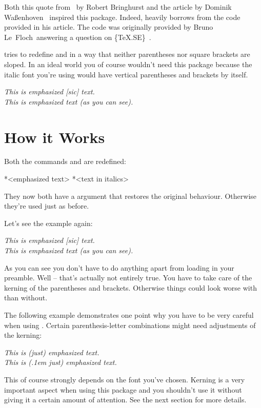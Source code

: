 \documentclass[DIV10,toc=index,toc=bib]{cnpkgdoc}
\begin{document}
\noindent
Both this quote from~ by Robert Bringhurst and the
article  by Dominik Waßenhoven~\cite{dtk12-dw} inspired
this package. Indeed, \embrac heavily borrows from the code \citeauthor{dtk12-dw}
provided in his article\manythanks. The code was originally provided by Bruno
Le~Floch\manythanks\ answering a question on \{TeX.SE\}~\cite{lefloch11}.

\embrac tries to redefine  and  in a way that neither
parentheses nor square brackets are sloped. In an ideal world you of course
wouldn't need this package because the italic font you're using would have
vertical parentheses and brackets by itself.

\begin{beispiel}
 \emph{This is emphasized [sic] text.} \\
 \emph{This is emphasized text (as you can see).}
\end{beispiel}

\section{How it Works}
Both the commands  and  are redefined:
\begin{beschreibung}
 *{<emphasized text>}
 *{<text in italics>}
\end{beschreibung}
They now both have a \code{*} argument that restores the original behaviour.
Otherwise they're used just as before.

Let's see the example again:
\begin{beispiel}
 \emph{This is emphasized [sic] text.} \\
 \emph{This is emphasized text (as you can see).}
\end{beispiel}
As you can see you don't have to do anything apart from loading \embrac in your
preamble. Well -- that's actually not entirely true. You have to take care of the
kerning of the parentheses and brackets. Otherwise things could look worse with
\embrac than without.

The following example demonstrates one point why you have to be very careful
when using \embrac. Certain parenthesis-letter combinations might need adjustments
of the kerning:
\begin{beispiel}
 \emph{This is (just) emphasized text.} \\
 \emph{This is (\kern.1em just) emphasized text.}
\end{beispiel}
This of course strongly depends on the font you've chosen. Kerning is a very
important aspect when using this package and you shouldn't use it without giving
it a certain amount of attention. See the next section for more details.
\end{document}

